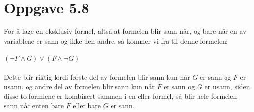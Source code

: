 \documentclass[norsk, 12pt]{article}
\begin{document}
\section{Oppgave 5.8}
For å lage en eksklusiv formel, altså at formelen blir sann når, og bare når en av variablene er sann og ikke den andre, så kommer vi fra til denne formelen: \\ \\
$(\neg F \land G) \lor (F \land \neg G)$  \\ \\
Dette blir riktig fordi første del av formelen blir sann kun når $G$ er sann og $F$ er usann, og andre del av formelen blir sann kun når $F$ er sann og $G$ er usann, siden disse to formlene er kombinert sammen i en eller formel, så blir hele formelen sann når enten bare $F$ eller bare $G$ er sann.
\end{document}
